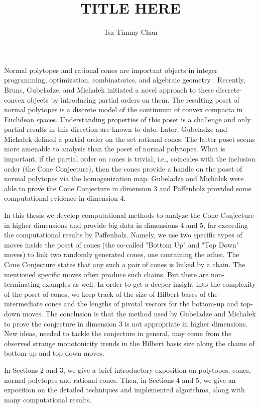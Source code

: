 \documentclass{TC}
\title{TITLE HERE}	%
\author{Tsz Timmy Chan}	%
\begin{document}

Normal polytopes and rational cones are important objects in integer programming, optimization, combinatorics, and algebraic geometry \cite{GubeladzePolytopesRingsKtheory}. Recently, Bruns, Gubeladze, and Micha\l{}ek \cite{BrunsGubeladzeNormalPolytopes} initiated a novel approach to these discrete-convex objects by introducing partial orders on them. The resulting poset of normal polytopes is a discrete model of the continuum of convex compacta in Euclidean spaces. Understanding properties of this poset is a challenge and only partial results in this direction are known to date. Later, Gubeladze and Micha\l{}ek \cite{GubeladzePosetCones} defined a partial order on the set rational cones. The latter poset seems more amenable to analysis than the poset of normal polytopes. What is important, if the partial order on cones is trivial, i.e., coincides with the inclusion order (the Cone Conjecture), then the cones provide a handle on the poset of normal polytopes via the homogenization map. Gubeladze and Micha\l{}ek were able to prove the Cone Conjecture in dimension 3 and Paffenholz provided some computational evidence in dimension 4.

In this thesis we develop computational methods to analyze the Cone Conjecture in higher dimensions and provide big data in dimensions 4 and 5, far exceeding the computational results by Paffenholz. Namely, we use two specific types of moves inside the poset of cones (the so-called "Bottom Up" and "Top Down" moves) to link two randomly generated cones, one containing the other. The Cone Conjecture states that any such a pair of cones is linked by a chain. The mentioned specific moves often produce such chains. But there are non-terminating examples as well. In order to get a deeper insight into the complexity of the poset of cones, we keep track of the size of Hilbert bases of the intermediate cones and the lengths of pivotal vectors for the bottom-up and top-down moves. The conclusion is that the method used by Gubeladze and Micha\l{}ek to prove the conjecture in dimension 3 is not appropriate in higher dimensions. New ideas, needed to tackle the conjecture in general, may come from the observed strange monotonicity trends in the Hilbert basis size along the chains of bottom-up and top-down moves. 

In Sections 2 and 3, we give a brief introductory exposition on polytopes, cones, normal polytopes and rational cones. Then, in Sections 4 and 5, we give an exposition on the detailed techniques and implemented algorithms, along with many computational results.
\end{document}
